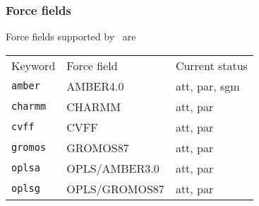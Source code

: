 \subsubsection{Force fields}
\label{forcefields}
Force fields supported by \nwargos\ are
\begin{center}
\begin{tabular}{lll}
\hline
Keyword      & Force field   & Current status \\
{\tt amber}  & AMBER4.0      & att, par, sgm  \\
{\tt charmm} & CHARMM        & att, par       \\
{\tt cvff}   & CVFF          & att, par       \\
{\tt gromos} & GROMOS87      & att, par       \\
{\tt oplsa}  & OPLS/AMBER3.0 & att, par       \\
{\tt oplsg}  & OPLS/GROMOS87 & att, par       \\
\hline
\end{tabular}
\end{center}  
